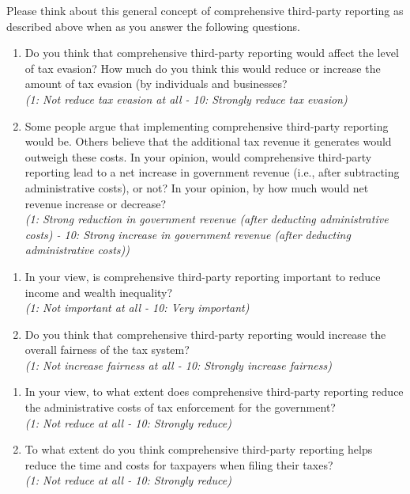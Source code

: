 \documentclass[11pt]{article}
\begin{document}
\noindent Please think about this general concept of comprehensive third-party reporting as described above when as you answer the following questions.

\begin{enumerate}[resume]
    \item Do you think that comprehensive third-party reporting would affect the level of tax evasion? How much do you think this would reduce or increase the amount of tax evasion (by individuals and businesses?\\
    \textit{(1: Not reduce tax evasion at all - 10: Strongly reduce tax evasion)}
    \item Some people argue that implementing comprehensive third-party reporting would be. Others believe that the additional tax revenue it generates would outweigh these costs. In your opinion, would comprehensive third-party reporting lead to a net increase in government revenue (i.e., after subtracting administrative costs), or not? In your opinion, by how much would net revenue increase or decrease?  \\
    \textit{(1: Strong reduction in government revenue (after deducting administrative costs) - 10: Strong increase in government revenue (after deducting administrative costs))}
\end{enumerate}
\begin{enumerate}[resume]
    \item In your view, is comprehensive third-party reporting important to reduce income and wealth inequality?\\
    \textit{(1: Not important at all - 10: Very important)}
    \item Do you think that comprehensive third-party reporting would increase the overall fairness of the tax system?\\
    \textit{(1: Not increase fairness at all - 10: Strongly increase fairness)}
\end{enumerate}
\begin{enumerate}[resume]
\item In your view, to what extent does comprehensive third-party reporting reduce the administrative costs of tax enforcement for the government?\\
\textit{(1: Not reduce at all - 10: Strongly reduce)}

\item To what extent do you think comprehensive third-party reporting helps reduce the time and costs for taxpayers when filing their taxes?\\
\textit{(1: Not reduce at all - 10: Strongly reduce)}
\end{enumerate}
\end{document}
